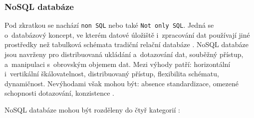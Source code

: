 \subsubsection{NoSQL databáze}
Pod zkratkou se nachází \texttt{non SQL} nebo také \texttt{Not only SQL}. Jedná se o~databázový koncept, ve kterém datové úložiště i~zpracování dat používají jiné prostředky než tabulková schémata tradiční relační databáze \cite{noSqlWiki}. NoSQL databáze jsou navrženy pro distribuovaná ukládání a~dotazování dat, souběžný přístup, a~manipulaci s~obrovským objemem dat. Mezi výhody patří: horizontální i~vertikální škálovatelnost, distribuovaný přístup, flexibilita schématu, dynamičnost. Nevýhodami však mohou být: absence standardizace, omezené schopnosti dotazování, konzistence \cite{noSqlIntro}.

\vspace{0.5cm}
\noindent NoSQL databáze mohou být rozděleny do čtyř kategorií \cite{noSqlOverview}:
